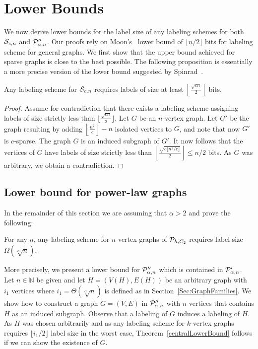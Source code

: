 
\section{Lower Bounds}
We now derive lower bounds for the label size of any  labeling schemes for both $ \mathcal{S}_{c,n}$ and  $ \mathcal{P}''_{\alpha,n}$.
Our proofs rely on  Moon's~\cite{moon1965minimal} lower bound of  $\lfloor n/2 \rfloor$ bits for labeling scheme for general graphs.
We first show that the upper bound achieved for sparse graphs is close to the best possible.
The following proposition is essentially a more precise version of the lower bound suggested by Spinrad~\cite{spinrad2003efficient}.
\begin{proposition}
Any  labeling scheme for $ \mathcal{S}_{c,n}$ requires  labels of size at least $\left\lfloor\frac{\sqrt{cn}}2\right\rfloor$ bits.
\end{proposition}
\begin{proof}
Assume for contradiction that there exists a labeling scheme  assigning labels of size strictly less than $\lfloor\frac{\sqrt{cn}}2\rfloor$.
Let $G$ be an $n$-vertex graph. Let $G'$ be the graph resulting by adding $\left\lfloor\frac{n^2}{c}\right\rfloor - n$ isolated vertices to $G$, and note that now $G'$ is $c$-sparse. The graph $G$ is an induced subgraph of  $G'$.
It now follows that the vertices of $G$ have  labels of size strictly less than 
$\left\lfloor\frac{\sqrt{c\lfloor n^2/c\rfloor}}2\right\rfloor \leq n/2$ bits. As $G$ was arbitrary, we obtain a contradiction.
\end{proof}

\subsection{Lower bound for power-law graphs}
In the remainder of this section we are assuming that $\alpha>2$ and  prove the following:
\begin{theorem}\label{centralLowerBound}
For any $n$, any labeling scheme for $n$-vertex graphs of $ \mathcal{P}_{h,C_2}$ requires label size $\Omega(\sqrt[\alpha]{n})$.
\end{theorem}
More precisely, we present a lower bound for $ \mathcal{P}''_{\alpha,n}$ which is contained in $ \mathcal{P}'_{\alpha,n}$. Let $n\in\mathbb N$ be given and let $H = (V(H),E(H))$ be an arbitrary graph with $i_1$ vertices where $i_1 = \Theta(\sqrt[\alpha]n)$ is defined as in Section~\ref{Sec:GraphFamilies}. We show how to construct a graph $G = (V,E)$ in $ \mathcal{P}''_{\alpha,n}$ with $n$ vertices that contains $H$ as an induced subgraph. Observe that a labeling of $G$ induces a labeling of $H$. As $H$ was chosen arbitrarily and as any labeling scheme for $k$-vertex graphs requires $\lfloor i_1/2 \rfloor$ label size in the worst case, Theorem~\ref{centralLowerBound} follows if we can show the existence of $G$.

